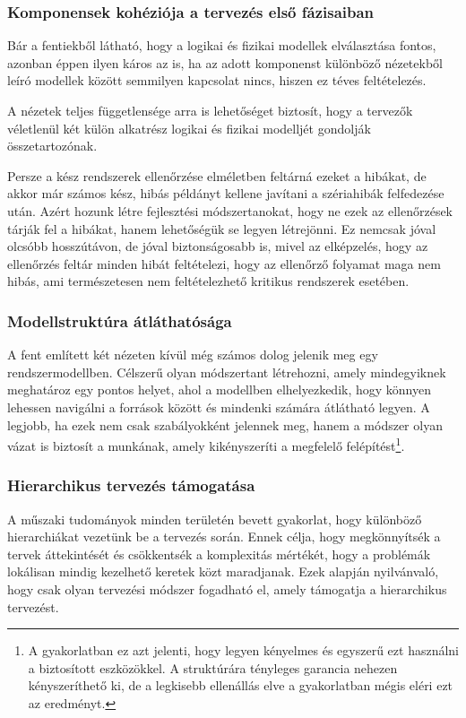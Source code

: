        \subsubsection{Komponensek kohéziója a tervezés első fázisaiban}
        Bár a fentiekből látható, hogy a logikai és fizikai modellek elválasztása fontos, azonban éppen ilyen káros az is, ha az adott komponenst különböző nézetekből leíró modellek között semmilyen kapcsolat nincs, hiszen ez téves feltételezés.
        
        A nézetek teljes függetlensége arra is lehetőséget biztosít, hogy a tervezők véletlenül két külön alkatrész logikai és fizikai modelljét gondolják összetartozónak.
        
        Persze a kész rendszerek ellenőrzése elméletben feltárná ezeket a hibákat, de akkor már számos kész, hibás példányt kellene javítani a szériahibák felfedezése után.
        Azért hozunk létre fejlesztési módszertanokat, hogy ne ezek az ellenőrzések tárják fel a hibákat, hanem lehetőségük se legyen létrejönni.
        Ez nemcsak jóval olcsóbb hosszútávon, de jóval biztonságosabb is, mivel az elképzelés, hogy az ellenőrzés feltár minden hibát feltételezi, hogy az ellenőrző folyamat maga nem hibás, ami természetesen nem feltételezhető kritikus rendszerek esetében.

        \subsubsection{Modellstruktúra átláthatósága}
        A fent említett két nézeten kívül még számos dolog jelenik meg egy rendszermodellben.
        Célszerű olyan módszertant létrehozni, amely mindegyiknek meghatároz egy pontos helyet, ahol a modellben elhelyezkedik, hogy könnyen lehessen navigálni a források között és mindenki számára átlátható legyen.
        A legjobb, ha ezek nem csak szabályokként jelennek meg, hanem a módszer olyan vázat is biztosít a munkának, amely kikényszeríti a megfelelő felépítést\footnote{A gyakorlatban ez azt jelenti, hogy legyen kényelmes és egyszerű ezt használni a biztosított eszközökkel. A struktúrára tényleges garancia nehezen kényszeríthető ki, de a legkisebb ellenállás elve a gyakorlatban mégis eléri ezt az eredményt.}.

        \subsubsection{Hierarchikus tervezés támogatása} \label{sec:Hierarhia}
        A műszaki tudományok minden területén bevett gyakorlat, hogy különböző hierarchiákat vezetünk be a tervezés során.
        Ennek célja, hogy megkönnyítsék a tervek áttekintését és csökkentsék a komplexitás mértékét, hogy a problémák lokálisan mindig kezelhető keretek közt maradjanak.
        Ezek alapján nyilvánvaló, hogy csak olyan tervezési módszer fogadható el, amely támogatja a hierarchikus tervezést.

